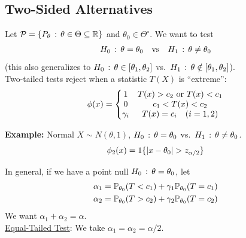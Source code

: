 
\subsection*{Two-Sided Alternatives}
\sectionspace

Let $\cal{P} = \{P_{\theta} \col \theta \in \Theta \subseteq \R\}$ and $\theta_0 \in \Theta^{\circ}$. We want to test
\[ H_0 \col \theta = \theta_0 \quad \tt{vs} \quad H_1 \col \theta \neq \theta_0 \]
(this also generalizes to $H_0 \col \theta \in [\theta_1, \theta_2]$ vs.\ $H_1 \col \theta \notin [\theta_1, \theta_2]$).\\

Two-tailed tests reject when a statistic $T(X)$ is ``extreme'':
\[ \phi(x) = \left\{\begin{matrix} 1 & T(x) > c_2 \tt{ or } T(x) < c_1 \\ 0 & c_1 < T(x) < c_2 \\ \gamma_i & T(x) = c_i \quad (i = 1, 2) \end{matrix}\right. \]

\begin{example}{\textbf{Example:} Normal}
    $X \sim N(\theta, 1)$, $H_0 \col \theta = \theta_0$ vs.\ $H_1 \col \theta \neq \theta_0$.
    \[ \phi_2(x) = 1\{\abs{x - \theta_0} > z_{\alpha/2}\} \]
\end{example}

In general, if we have a point null $H_0 \col \theta = \theta_0$, let
\begin{align*}
    \alpha_1 &= \bb{P}_{\theta_0}(T < c_1) + \gamma_1\bb{P}_{\theta_0}(T = c_1)\\
    \alpha_2 &= \bb{P}_{\theta_0}(T > c_2) + \gamma_2\bb{P}_{\theta_0}(T = c_2)
\end{align*}
We want $\alpha_1 + \alpha_2 = \alpha$.\\

\underline{Equal-Tailed Test}: We take $\alpha_1 = \alpha_2 = \alpha/2$.


